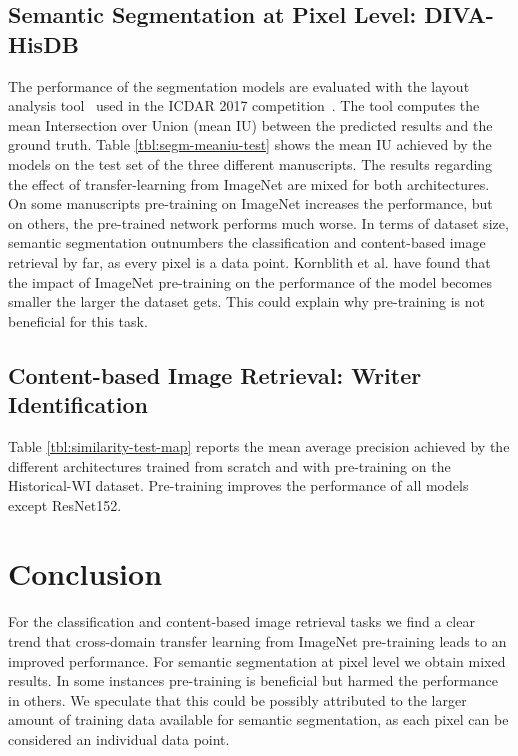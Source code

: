 \documentclass[journal]{IEEEtran}
\newcommand{\af}[1]{{\color{black}#1}}
\newcommand{\ls}[1]{{\color{black}#1}}
\begin{document}
\subsection{Semantic Segmentation at Pixel Level: DIVA-HisDB}
The performance of the segmentation models are evaluated \af{with} the layout analysis tool~\cite{alberti2017open} used in the \ac{ICDAR} 2017 competition~\cite{simistira2017icdar2017}. 
The tool computes the mean Intersection over Union (mean IU) between the predicted results and the ground truth. 
Table \ref{tbl:segm-meaniu-test} shows the mean IU achieved by the models on the test set of the three different manuscripts. 
The results regarding the effect of transfer-learning from ImageNet are mixed for both architectures.
On some manuscripts pre-training on ImageNet increases the performance, but on others, the pre-trained network performs much worse.
\ls{In terms of dataset size, semantic segmentation outnumbers the classification and content-based image retrieval by far, as every pixel is a data point.
Kornblith et al. \cite{kornblith2018better} have found that the impact of ImageNet pre-training on the performance of the model becomes smaller the larger the dataset gets. This could explain why pre-training is not beneficial for this task.}

\subsection{Content-based Image Retrieval: Writer Identification}
Table \ref{tbl:similarity-test-map} reports the mean average precision achieved by the different architectures trained from scratch and with pre-training on the Historical-WI dataset.
Pre-training \af{improves} the performance of all models except ResNet152. 
 
\section{Conclusion}
\label{toc:conclusion}

\ls{For the classification and content-based image retrieval tasks we find a clear trend that cross-domain transfer learning from ImageNet pre-training leads to an improved performance. 
For semantic segmentation at pixel level we obtain mixed results. In some instances pre-training is beneficial but harmed the performance in others.
We speculate that this could be possibly attributed to the larger amount of training data available for semantic segmentation, as each pixel can be considered an individual data point.}
\end{document}
